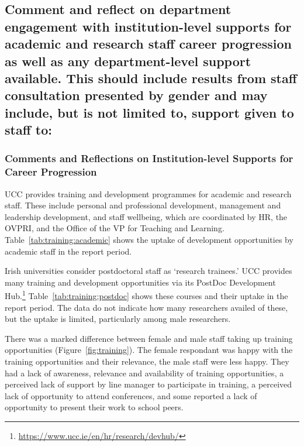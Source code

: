 \subsection{Comment and reflect on department engagement with institution-level supports for academic and research staff career progression as well as any department-level support available. This should include results from staff consultation presented by gender and may include, but is not limited to, support given to staff to:}\label{sec:2f}

\subsubsection{Comments and Reflections on Institution-level Supports for Career Progression} 

UCC provides training and development programmes for academic and research staff. These include personal and professional development, management and leadership development, and staff wellbeing, which are coordinated by HR, the \ac{OVPRI}, and the Office of the VP for Teaching and Learning. 
Table~\ref{tab:training:academic} 
shows the uptake of development opportunities by academic staff in the report period.  




Irish universities consider postdoctoral staff as `research trainees.' UCC provides many training and development opportunities via its PostDoc Development Hub.\footnote{\url{https://www.ucc.ie/en/hr/research/devhub/}} 
Table~\ref{tab:training:postdoc} shows these courses and their uptake in the report period. The data do not indicate how many researchers availed of these, but the uptake is limited, particularly among male researchers. 
 

\newpage 


There was a marked difference between female and male staff taking up training opportunities (Figure~\ref{fig:training}). The female respondant was happy with the training opportunities and their relevance, the male staff were less happy. They had a lack of awareness, relevance and availability of training opportunities, a perceived lack of support by line manager to participate in training, a perceived lack of opportunity to attend conferences, and some reported a lack of opportunity to present their work to school peers.

